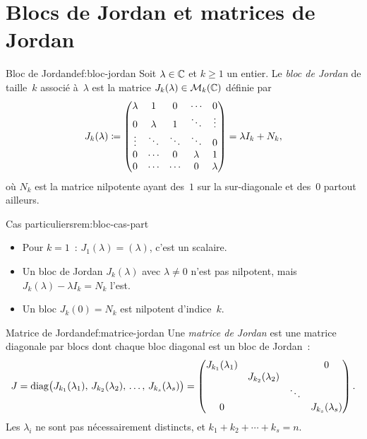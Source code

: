 \section{Blocs de Jordan et matrices de Jordan}\label{sec:blocs-jordan}

\begin{definition}{Bloc de Jordan}{def:bloc-jordan}
  Soit $\lambda\in{\mathbb{C}}$ et $k\geq 1$ un entier. Le \emph{bloc de Jordan}%
   de taille~$k$ associé à~$\lambda$ est la
  matrice $J_k(\lambda)\in\mathcal{M}_k({\mathbb{C}})$ définie par
  \[
    J_k(\lambda)\coloneqq
    \begin{pmatrix}
      \lambda & 1      & 0      & \cdots & 0 \\
      0       &\lambda & 1      & \ddots & \vdots \\
      \vdots  &\ddots  &\ddots  & \ddots & 0 \\
      0       &\cdots  & 0      &\lambda & 1 \\
      0       &\cdots  & \cdots & 0      & \lambda
    \end{pmatrix}
    =\lambda I_k+N_k,
  \]
  où $N_k$ est la matrice nilpotente
  ayant des~$1$ sur la sur-diagonale et des~$0$ partout ailleurs.
\end{definition}

\begin{remark}{Cas particuliers}{rem:bloc-cas-part}
  \begin{itemize}
    \item Pour $k=1$~: $J_1(\lambda)=(\lambda)$, c'est un scalaire.
    \item Un bloc de Jordan $J_k(\lambda)$ avec $\lambda\neq 0$ n'est pas
      nilpotent, mais $J_k(\lambda)-\lambda I_k=N_k$ l'est.
    \item Un bloc $J_k(0)=N_k$ est nilpotent d'indice~$k$.
  \end{itemize}
\end{remark}

\begin{definition}{Matrice de Jordan}{def:matrice-jordan}
  Une \emph{matrice de Jordan} est une matrice
  diagonale par blocs dont chaque bloc diagonal est un bloc de Jordan~:
  \[
    J=\operatorname{diag}\bigl(J_{k_1}(\lambda_1),\,J_{k_2}(\lambda_2),\,\ldots,\,
    J_{k_s}(\lambda_s)\bigr)
    =\begin{pmatrix}
      J_{k_1}(\lambda_1) & & & 0 \\
       & J_{k_2}(\lambda_2) & & \\
       & & \ddots & \\
      0 & & & J_{k_s}(\lambda_s)
    \end{pmatrix}.
  \]
  Les $\lambda_i$ ne sont pas nécessairement distincts, et
  $k_1+k_2+\cdots+k_s=n$.
\end{definition}

